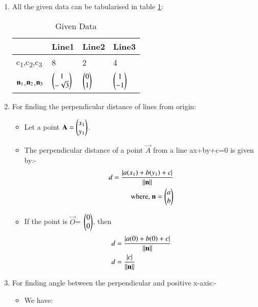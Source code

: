 \documentclass[journal,12pt,twocolumn]{IEEEtran}
\begin{document}
\begin{enumerate}
\item  All the given data can be tabularised in table \ref{tab:table1}:
\begin{table}[!ht]
\begin{center}
\begin{tabular}{ | m{2cm} | m{1.2cm}| m{1.2cm} | m{1.2cm} |} 
\hline
 & Line1 & Line2 & Line3 \\
\hline
c\textsubscript{1},c\textsubscript{2},c\textsubscript{3} & 8 & 2 & 4 \\ 
\hline
$\vec{n\textsubscript{1}}$,$\vec{n\textsubscript{2}}$,$\vec{n\textsubscript{3}}$ & $\myvec{1\\-\sqrt{3}}$ & $\myvec{0\\1}$ &$\myvec{1\\-1}$ \\ 
\hline
\end{tabular}
\end{center}
\caption{Given Data}
\label{tab:table1}
\end{table}
\item For finding the perpendicular distance of lines from origin:
\begin{itemize}
\item Let a point $\vec{A}=\myvec{x\textsubscript{1}\\y\textsubscript{1}}$.
\item The perpendicular distance of a point $\vec{A}$ from a line ax+by+c=0 is given by:-
\begin{align}
d=\frac { \left| a(x\textsubscript{1})+b(y\textsubscript{1})+c \right| }{ \norm{\vec{n}} }
\\
\text{where, } \vec{n}=\myvec{a\\b}
\end{align}
\item If the point is $\vec{O}$= $\myvec{0\\0}$, then
\begin{align}
d &=\frac { \left| a(0)+b(0)+c \right| }{ \norm{\vec{n}}}
\\
d&=\frac { \left| c \right| }{\norm{\vec{n}}}\label{eqA}
\end{align}
\end{itemize}
\item For finding angle between the perpendicular and positive x-axis:-
\begin{itemize}
    \item We have: 
    \begin{align}

\end{align}
\end{itemize}
\end{enumerate}
\end{document}
